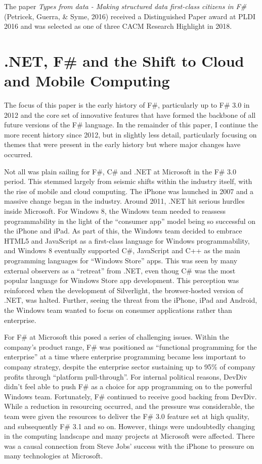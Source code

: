 \documentclass[acmsmall]{acmart}\settopmatter{}
\begin{document}
The paper \textit{Types from data - Making structured data first-class citizens in F\#} (Petricek, Guerra, \& Syme, 2016) received a Distinguished Paper award at PLDI 2016 and was selected as one of three CACM Research Highlight in 2018.



\section*{.NET, F\# and the Shift to Cloud and Mobile Computing}

The focus of this paper is the early history of F\#, particularly up to F\# 3.0 in 2012 and the core set of innovative
features that have formed the backbone of all future versions of the F\# language. In the remainder of this paper, I
continue the more recent history since 2012, but in slightly less detail, particularly focusing on themes that were
present in the early history but where major changes have occurred.

Not all was plain sailing for F\#, C\# and .NET at Microsoft in the F\# 3.0 period.  This stemmed largely from seismic
shifts within the industry itself, with the rise of mobile and cloud computing.  The iPhone was launched in 2007 and a
massive change began in the industry. Around 2011, .NET hit serious hurdles inside Microsoft. For Windows 8, the
Windows team needed to reassess programmability in the light of the “consumer app” model being so successful on the
iPhone and iPad. As part of this, the Windows team decided to embrace HTML5 and JavaScript as a first-class language
for Windows programmability, and Windows 8 eventually supported C\#, JavaScript and C++ as the main programming
languages for “Windows Store” apps.  This was seen by many external observers as a “retreat” from .NET, even thoug
 C\# was the most popular language for Windows Store app development. This perception was reinforced when the
development of Silverlight, the browser-hosted version of .NET, was halted. Further, seeing the threat from the iPhone,
iPad and Android, the Windows team wanted to focus on consumer applications rather than enterprise.  

For F\# at Microsoft this posed a series of challenging issues. Within the company’s product range, F\# was positioned
as “functional programming for the enterprise” at a time where enterprise programming became less important to company
strategy, despite the enterprise sector sustaining up to 95\% of company profits through “platform pull-through”. For internal
political reasons, DevDiv didn’t feel able to push F\# as a choice for app programming on to the powerful Windows team.
Fortunately, F\# continued to receive good backing from DevDiv. While a reduction in resourcing occurred, and the pressure
was considerable, the team were given the resources to deliver the F\# 3.0 feature set at high quality, and
subsequently F\# 3.1 and so on.  However, things were undoubtedly changing in the computing landscape and many
projects at Microsoft were affected. There was a causal connection from Steve Jobs’ success with the iPhone to pressure
on many technologies at Microsoft.  
\end{document}

